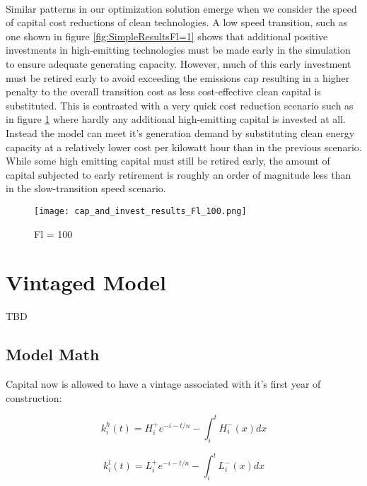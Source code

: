 \documentclass{easychithesis}
\begin{document}
\paragraph{} Similar patterns in our optimization solution emerge when we consider the speed of capital cost reductions of clean technologies. A low speed transition, such as one shown in figure \ref{fig:SimpleResultsFl=1} shows that additional positive investments in high-emitting technologies must be made early in the simulation to ensure adequate generating capacity. However, much of this early investment must be retired early to avoid exceeding the emissions cap resulting in a higher penalty to the overall transition cost as less cost-effective clean capital is substituted. This is contrasted with a very quick cost reduction scenario such as in figure \ref{fig:SimpleResultsFl=100} where hardly any additional high-emitting capital is invested at all. Instead the model can meet it's generation demand by substituting clean energy capacity at a relatively lower cost per kilowatt hour than in the previous scenario. While some high emitting capital must still be retired early, the amount of capital subjected to early retirement is roughly an order of magnitude less than in the slow-transition speed scenario. 

\begin{figure}[h]
\texttt{[image: cap\_and\_invest\_results\_Fl\_100.png]}
\caption{Fl = 100\label{fig:SimpleResultsFl=100}}
\end{figure}



\FloatBarrier

\section{Vintaged Model}

TBD


\subsection{Model Math}

Capital now is allowed to have a vintage associated with it's first year of construction:

\begin{equation}
k_i^h(t) = H_i^+ e^{-i-t/n} - \int_i^t H^-_i(x)dx
\end{equation}

\begin{equation}
k_i^l(t) = L_i^+ e^{-i-t/n} - \int_i^t L^-_i(x)dx
\end{equation}
\end{document}
